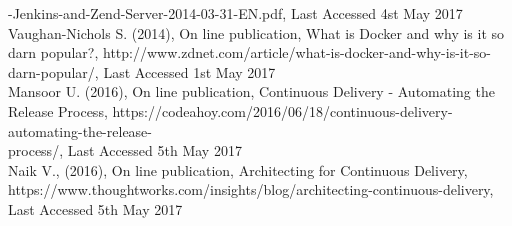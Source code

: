 \begin{thebibliography}{0}
-Jenkins-and-Zend-Server-2014-03-31-EN.pdf, Last Accessed 4st May 2017
\\
Vaughan-Nichols S. (2014), On line publication, What is Docker and why is it so darn popular?, http://www.zdnet.com/article/what-is-docker-and-why-is-it-so-darn-popular/, Last Accessed 1st May 2017
\\
Mansoor U. (2016), On line publication, Continuous Delivery - Automating the Release Process, https://codeahoy.com/2016/06/18/continuous-delivery-automating-the-release-\\process/, Last Accessed 5th May 2017
\\
Naik V., (2016), On line publication, Architecting for Continuous Delivery, https://www.thoughtworks.com/insights/blog/architecting-continuous-delivery, Last Accessed 5th May 2017

\end{thebibliography}
